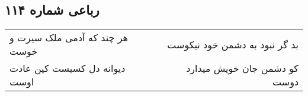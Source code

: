 \begin{center}
\section*{رباعی شماره ۱۱۴}
\label{sec:sh114}
\begin{longtable}{l p{0.5cm} r}
هر چند که آدمی ملک سیرت و خوست
&&
بد گر نبود به دشمن خود نیکوست
\\
دیوانه دل کسیست کین عادت اوست
&&
کو دشمن جان خویش میدارد دوست
\\
\end{longtable}
\end{center}
